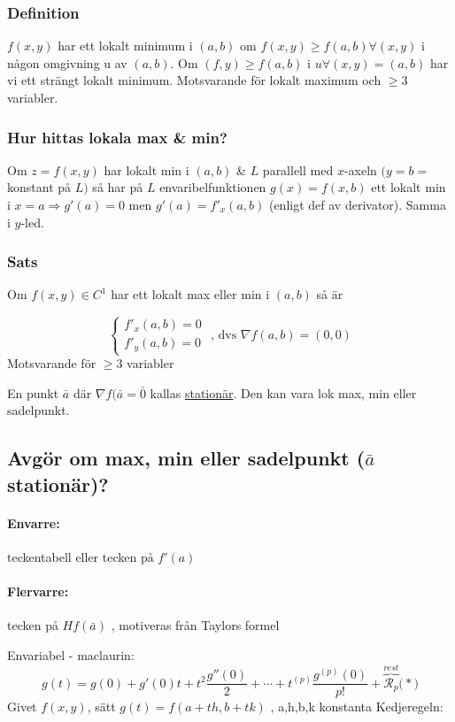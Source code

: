 \documentclass{article}
\begin{document}
\subsubsection{Definition}
\(f(x,y)\) har ett lokalt minimum i \((a,b)\) om \(f(x,y) \geq f(a,b) \forall (x,y)\) i någon omgivning u av \((a,b)\). Om \((f,y) \geq f(a,b)\) i \(u \forall (x,y) = (a,b)\) har vi ett strängt lokalt minimum.
Motsvarande för lokalt maximum och \(\geq 3\) variabler.

\subsubsection{Hur hittas lokala max \& min?}
Om \(z=f(x,y)\) har lokalt min i \((a,b)\) \& \(L\) parallell med \(x\)-axeln \(\big(y=b=\)konstant på \(L \big)\) så har på \(L\) envaribelfunktionen \(g(x) = f(x,b)\) ett lokalt min i \(x=a \Rightarrow g'(a) = 0\) men 
\(g'(a) = f'_x(a,b)\) \big(enligt def av derivator\big). Samma i \(y\)-led.

\subsubsection{Sats}
Om \(f(x,y) \in C^1\) har ett lokalt max eller min i \((a,b)\) så är

$$
\left\{\begin{array}{rcl}
	f'_x(a,b) = 0 \\
	f'_y(a,b) = 0
\end{array}\right.
\text{ , dvs }\nabla f(a,b) = (0,0)
$$
Motsvarande för $\geq 3$ variabler

En punkt $\bar{a}$ där $\nabla f(\bar{a} = \bar{0}$ kallas \underline{stationär}. Den kan vara lok max, min eller sadelpunkt.

\newpage
\subsection{Avgör om max, min eller sadelpunkt (\texorpdfstring{$\bar{a}$}{a} stationär)?} \label{sec:Hessian}
\paragraph{Envarre:} teckentabell eller tecken på $f'(a)$
\paragraph{Flervarre:} tecken på $H f(\bar{a})$ , motiveras från Taylors formel

Envariabel - maclaurin: 
\begin{equation}\label{eq:6.1}
	g(t) = g(0) + g'(0)t + t^2\frac{g''(0)}{2} + \cdots + t^{(p)}\frac{g^{(p)}(0)}{p!} + \overbrace{\mathcal{R}_p}^{rest} \Big(*\Big)
\end{equation}
Givet $f(x,y)$, sätt $g(t) = f(a+th,b+tk)$ ,  a,h,b,k konstanta \newline
Kedjeregeln:
\end{document}
